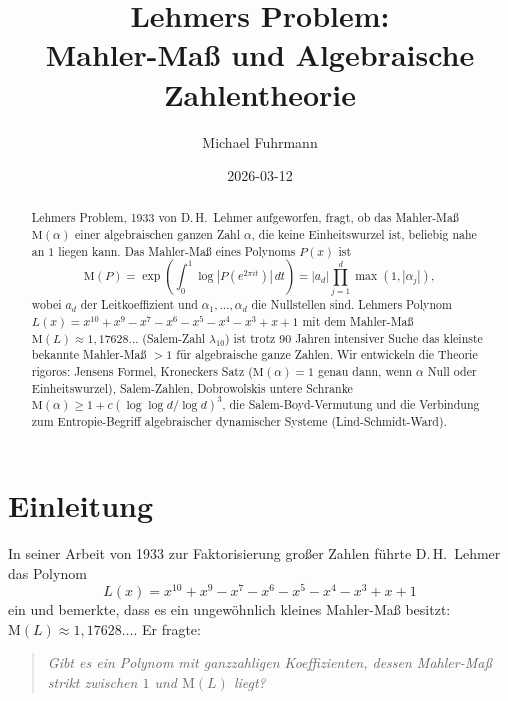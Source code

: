 \documentclass[12pt,a4paper]{amsart}
\theoremstyle{definition}
\theoremstyle{remark}
\newcommand{\M}{\mathrm{M}}
\begin{document}

\title{Lehmers Problem:\\
  Mahler-Maß und Algebraische Zahlentheorie}

\author{Michael Fuhrmann}
\address{Specialist Mathematics Project, Build 167}
\date{2026-03-12}

\begin{abstract}
Lehmers Problem, 1933 von D.\,H.\ Lehmer aufgeworfen, fragt, ob das Mahler-Maß
$\M(\alpha)$ einer algebraischen ganzen Zahl $\alpha$, die keine Einheitswurzel ist,
beliebig nahe an $1$ liegen kann. Das Mahler-Maß eines Polynoms $P(x)$ ist
\[
  \M(P) = \exp\!\left(\int_0^1 \log|P(e^{2\pi i t})|\,dt\right)
        = |a_d| \prod_{j=1}^d \max(1, |\alpha_j|),
\]
wobei $a_d$ der Leitkoeffizient und $\alpha_1,\ldots,\alpha_d$ die Nullstellen sind.
Lehmers Polynom $L(x) = x^{10}+x^9-x^7-x^6-x^5-x^4-x^3+x+1$ mit dem Mahler-Maß
$\M(L) \approx 1{,}17628\ldots$ (Salem-Zahl $\lambda_{10}$) ist trotz 90 Jahren
intensiver Suche das kleinste bekannte Mahler-Maß $> 1$ für algebraische ganze Zahlen.
Wir entwickeln die Theorie rigoros: Jensens Formel, Kroneckers Satz ($\M(\alpha)=1$
genau dann, wenn $\alpha$ Null oder Einheitswurzel), Salem-Zahlen,
Dobrowolskis untere Schranke $\M(\alpha) \geq 1 + c(\log\log d/\log d)^3$,
die Salem-Boyd-Vermutung und die Verbindung zum Entropie-Begriff algebraischer
dynamischer Systeme (Lind-Schmidt-Ward).
\end{abstract}

\maketitle

\tableofcontents

\section{Einleitung}

In seiner Arbeit von 1933 zur Faktorisierung großer Zahlen \cite{Lehmer1933} führte
D.\,H.\ Lehmer das Polynom
\[
  L(x) = x^{10}+x^9-x^7-x^6-x^5-x^4-x^3+x+1
\]
ein und bemerkte, dass es ein ungewöhnlich kleines Mahler-Maß besitzt:
$\M(L) \approx 1{,}17628\ldots$.
Er fragte:
\begin{quote}
  \textit{Gibt es ein Polynom mit ganzzahligen Koeffizienten, dessen Mahler-Maß
  strikt zwischen $1$ und $\M(L)$ liegt?}
\end{quote}
\end{document}
